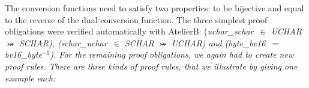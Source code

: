 \documentclass[a4paper]{llncs}
\begin{document}
The conversion functions need to satisfy two properties: to be
bijective and equal to the reverse of the dual conversion
function. The three simplest proof obligations were verified
automatically with AtelierB: (\it uchar\_schar\rm \ $\in$
\textit{UCHAR} $\bij$ \textit{SCHAR}), (\it schar\_uchar\rm \ $\in$
\textit{SCHAR} $\bij$ \textit{UCHAR}) and (\it byte\_bv16\rm \ $=$ \it
bv16\_byte\rm $^{-1}$).
%
%
For the remaining proof obligations, we again had to create new proof
rules. There are three kinds of proof rules, that we illustrate by giving
one example each:
\end{document}
